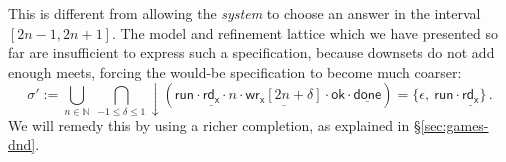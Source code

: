 \documentclass[draft,11pt]{report}
\theoremstyle{definition}
\newcommand{\kw}[1]{\ensuremath{ \mathsf{#1} }}
\begin{document}
This is different from allowing the \emph{system}
to choose an answer in the interval $[2n - 1, 2n + 1]$.
The model and refinement lattice which
we have presented so far are insufficient
to express such a specification,
because downsets do not add enough meets,
forcing the would-be specification to become
much coarser:
\[
  \sigma' :=
    \bigcup_{n \in \mathbb{N}} \:
    \bigcap_{-1 \le \delta \le 1}
    {\downarrow}(
      \kw{run} \cdot
      \underline{\kw{rd}_\kw{x}} \cdot n \cdot
      \underline{\kw{wr}_\kw{x}[2n + \delta]} \cdot \kw{ok} \cdot
      \underline{\kw{done}}) =
      \{ \epsilon,  \: \kw{run} \cdot \underline{\kw{rd}_\kw{x}} \}
    \,.
\]
We will remedy this by using a richer completion,
as explained in \S\ref{sec:games-dnd}.


%
%
%
%
%
\end{document}
